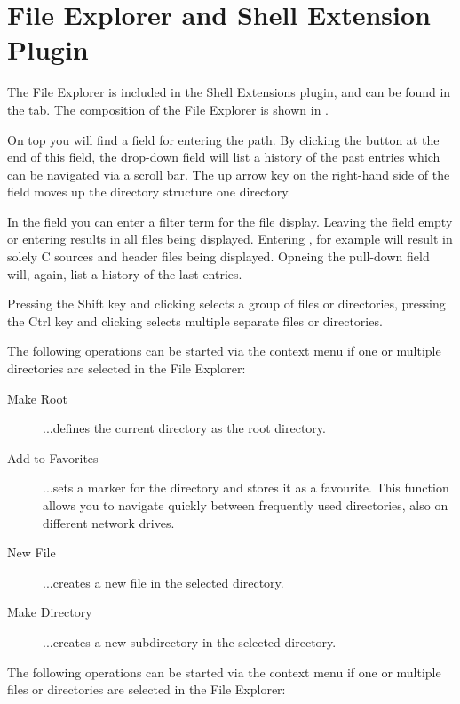 \section{File Explorer and Shell Extension Plugin}\label{sec:file_explorer}

The File Explorer  is included in the Shell Extensions plugin, and can be found in the  tab. The composition of the File Explorer is shown in .

On top you will find a field for entering the path. By clicking the button at the end of this field, the drop-down field will list a history of the past entries which can be navigated via a scroll bar. The up arrow key on the right-hand side of the field moves up the directory structure one directory.

In the  field you can enter a filter term for the file display. Leaving the field empty or entering \codeline{*} results in all files being displayed. Entering , for example will result in solely C sources and header files being displayed. Opneing the pull-down field will, again, list a history of the last entries.


Pressing the Shift key and clicking selects a group of files or directories, pressing the Ctrl key and clicking selects multiple separate files or directories.

The following operations can be started via the context menu if one or multiple directories are selected in the File Explorer:

\begin{description}
\item[Make Root] ...defines the current directory as the root directory.
\item[Add to Favorites] ...sets a marker for the directory and stores it as a favourite. This function allows you to navigate quickly between frequently used directories, also on different network drives.
\item[New File] ...creates a new file in the selected directory.
\item[Make Directory] ...creates a new subdirectory in the selected directory.
\end{description}

The following operations can be started via the context menu if one or multiple files or directories are selected in the File Explorer:

